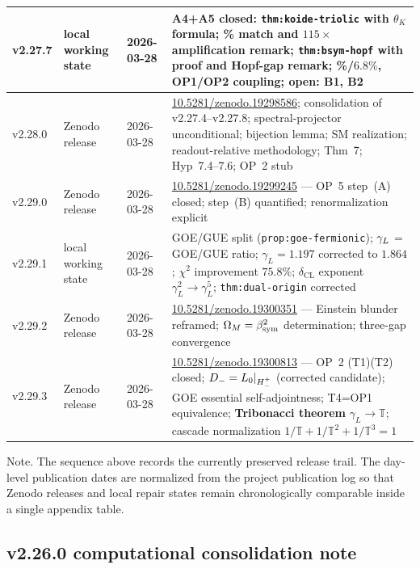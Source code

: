 {\begin{longtable}{|p{}|p{}|p{}|p{}|}
\hline
v2.27.7 & local working state & 2026-03-28 & A4+A5 closed: \texttt{thm:koide-triolic} with $\theta_K$ formula; \newline 0.111\% match and $115\times$ amplification remark; \newline \texttt{thm:bsym-hopf} with proof and Hopf-gap remark; \newline 4.9\%/$6.8\%$, OP1/OP2 coupling; open: B1, B2 \\
\hline
v2.28.0 & Zenodo release & 2026-03-28 & \href{https://doi.org/10.5281/zenodo.19298586}{10.5281/zenodo.19298586}; consolidation of v2.27.4--v2.27.8; spectral-projector unconditional; bijection lemma; SM realization; readout-relative methodology; Thm~7; Hyp~7.4--7.6; OP~2 stub \\
\hline
v2.29.0 & Zenodo release & 2026-03-28 & \href{https://doi.org/10.5281/zenodo.19299245}{10.5281/zenodo.19299245} --- OP~5 step~(A) closed; step~(B) quantified; renormalization explicit \\
\hline
v2.29.1 & local working state & 2026-03-28 & GOE/GUE split (\texttt{prop:goe-fermionic}); $\gamma_L$ = GOE/GUE ratio; $\gamma_L=1.197$ corrected to $1.864$; $\chi^2$ improvement $75.8\%$; $\delta_{\mathrm{CL}}$ exponent $\gamma_L^2\to\gamma_L^5$; \texttt{thm:dual-origin} corrected \\
\hline
v2.29.2 & Zenodo release & 2026-03-28 & \href{https://doi.org/10.5281/zenodo.19300351}{10.5281/zenodo.19300351} --- Einstein blunder reframed; $\Omega_M=\beta_{\mathrm{sym}}^2$ determination; three-gap convergence \\
\hline
v2.29.3 & Zenodo release & 2026-03-28 & \href{https://doi.org/10.5281/zenodo.19300813}{10.5281/zenodo.19300813} --- OP~2 (T1)(T2) closed; $D_-=L_0|_{H^+_-}$ (corrected candidate); GOE essential self-adjointness; T4=OP1 equivalence; \textbf{Tribonacci theorem} $\gamma_L\to\mathbb{T}$; cascade normalization $1/\mathbb{T}+1/\mathbb{T}^2+1/\mathbb{T}^3=1$ \\
\hline
\end{longtable}
}

\noindent Note. The sequence above records the currently preserved release trail.
The day-level publication dates are normalized from the project publication log so that
Zenodo releases and local repair states remain chronologically comparable inside a single
appendix table.


\subsection*{v2.26.0 computational consolidation note}


